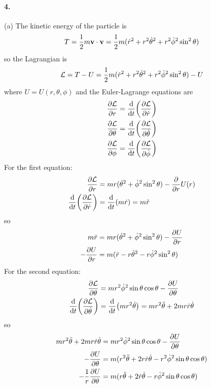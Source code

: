 \documentclass[../hw.tex]{subfiles}
\begin{document}
\paragraph*{4.} (a) The kinetic energy of the particle is
\begin{align*}
    T = \frac{1}{2} m \vb v \cdot \vb v
        = \frac{1}{2} m (\dot r^2 + r^2 \dot\theta^2 + r^2 \dot \phi^2 \sin^2\theta )
\end{align*}
so the Lagrangian is
\begin{align*}
    \mathcal{L} = T - U = \frac{1}{2} m (\dot r^2 + r^2 \dot\theta^2 + r^2 \dot \phi^2 \sin^2\theta) - U
\end{align*}
where $U = U(r, \theta, \phi)$ and the Euler-Lagrange equations are
\begin{align*}
    \pdv{\mathcal{L}}{r} &= \dv{t}(\pdv{\mathcal{L}}{\dot r}) \\
    \pdv{\mathcal{L}}{\theta} &= \dv{t}(\pdv{\mathcal{L}}{\dot \theta}) \\
    \pdv{\mathcal{L}}{\phi} &= \dv{t}(\pdv{\mathcal{L}}{\dot \phi})
\end{align*}
For the first equation:
\begin{align*}
    \pdv{\mathcal{L}}{r} &= mr (\dot \theta^2 + \dot \phi^2 \sin^2\theta) - \pdv{r} U(r) \\
    \dv{t}(\pdv{\mathcal{L}}{\dot r}) &= \dv{t}(m \dot r) = m \ddot r
\end{align*}
so 
\begin{align*}
    m \ddot r &= mr (\dot \theta^2 + \dot \phi^2\sin^2\theta) - \pdv{U}{r} \\
    -\pdv{U}{r} &= m (\ddot r - r \dot \theta^2 - r \dot \phi^2 \sin^2\theta)
\end{align*}
For the second equation:
\begin{align*}
    \pdv{\mathcal{L}}{\theta} &= mr^2 \dot\phi^2 \sin\theta \cos\theta - \pdv{U}{\theta} \\
    \dv{t}(\pdv{\mathcal{L}}{\dot \theta}) &= \dv{t}(mr^2 \dot\theta) = m r^2 \ddot\theta + 2mr\dot r \dot\theta
\end{align*}
so 
\begin{align*}
    m r^2 \ddot\theta + 2mr \dot r \dot \theta &= mr^2 \dot\phi^2 \sin\theta \cos\theta - \pdv{U}{\theta} \\
    -\pdv{U}{\theta} &= m (r^2 \ddot\theta + 2r \dot r \dot \theta - r^2 \dot\phi^2 \sin\theta \cos\theta) \\
    - \frac{1}{r} \pdv{U}{\theta} &= m (r\ddot \theta + 2 \dot r \dot \theta - r \dot\phi^2 \sin\theta \cos\theta)
\end{align*}
\end{document}
